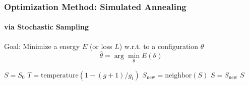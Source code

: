 \documentclass[xcolor=dvipsnames,envcountsect]{beamer}
\begin{document}


\begin{frame}[fragile]\frametitle{Optimization Method: Simulated Annealing}\framesubtitle{via Stochastic Sampling}
Goal: Minimize a energy $E$ (or loss $L$) w.r.t. to a configuration $\theta$
$$ 
\widehat{\theta} = \arg\min_{\theta} E(\theta)
$$

\begin{algorithm}[H]
\begin{algorithmic}[1]
\STATE $S = S_0$
\STATE $T = \text{temperature}(1 - (g+1) / g_t)$ 
\STATE $S_{\text{new}} = \text{neighbor}(S)$
    \STATE $S = S_{\text{new}}$
\ENDIF
\ENDFOR
\RETURN $S$
\end{algorithmic}
\end{algorithm}


\end{frame}
\end{document}
